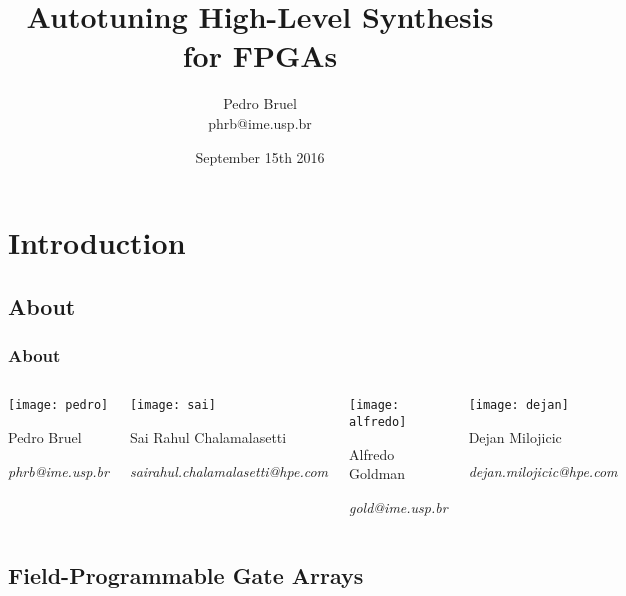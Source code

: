 \documentclass[10pt, compress, aspectratio=169]{beamer}
\title{Autotuning High-Level Synthesis for FPGAs}
\author{\footnotesize Pedro Bruel \\ {\scriptsize phrb@ime.usp.br}}
\institute{\texttt{[image: imelogo]}\\[0.2cm] Universidade de São Paulo}
\date{\scriptsize September 15th 2016}
\begin{document}
\maketitle

\section{Introduction}

\subsection{About}

\begin{frame}
    \frametitle{About}
    \begin{columns}[T,onlytextwidth]
        \begin{center}
            \texttt{[image: pedro]}

            Pedro Bruel

            \textit{phrb@ime.usp.br}
        \end{center}

        \begin{center}
            \texttt{[image: sai]}

            Sai Rahul Chalamalasetti

            \textit{sairahul.chalamalasetti@hpe.com}
        \end{center}

        \begin{center}
            \texttt{[image: alfredo]}

            Alfredo Goldman

            \textit{gold@ime.usp.br}
        \end{center}

        \begin{center}
            \texttt{[image: dejan]}

            Dejan Milojicic

            \textit{dejan.milojicic@hpe.com}
        \end{center}

    \end{columns}
\end{frame}

\subsection{Field-Programmable Gate Arrays}
\end{document}

